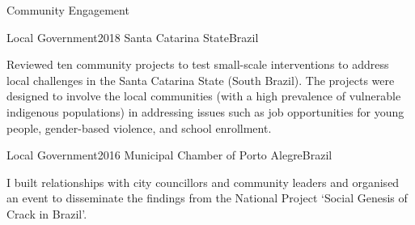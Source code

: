 \begin{rSection}{Community Engagement}

\begin{rSubsection}
{Local Government}{2018}
{Santa Catarina State}{Brazil}\par
{Reviewed ten community projects to test small-scale interventions to address local challenges in the Santa Catarina State (South Brazil). The projects were designed to involve the local communities (with a high prevalence of vulnerable indigenous populations) in addressing issues such as job opportunities for young people, gender-based violence, and school enrollment.}
\end{rSubsection}

\vspace{1em}

\begin{rSubsection}
{Local Government}{2016}
{Municipal Chamber of Porto Alegre}{Brazil}\par
{I built relationships with city councillors and community leaders and organised an event to disseminate the findings from the National Project `Social Genesis of Crack in Brazil'.}
\end{rSubsection}

\end{rSection}